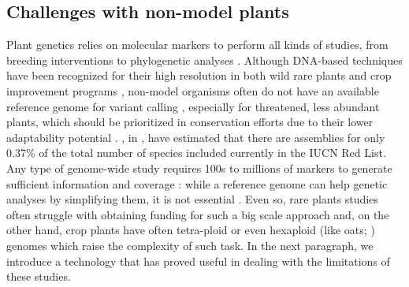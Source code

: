 \documentclass[a4paper, 12pt]{report}
\begin{document}
\subsection{Challenges with non-model plants}
Plant genetics relies on molecular markers to perform all kinds of studies, from breeding interventions to phylogenetic analyses \parencite{heGenotypingbysequencingGBSUltimate2014}. Although DNA-based techniques have been recognized for their high resolution in both wild rare plants and crop improvement programs \parencite{salgotraGeneticDiversityConservation2023}, non-model organisms often do not have an available reference genome for variant calling \parencite{suppleConservationBiodiversityGenomics2018}, especially for threatened, less abundant plants, which should be prioritized in conservation efforts due to their lower adaptability potential \parencite{yinPlantConservationAge2024}. \citeauthor{yinPlantConservationAge2024}, in \citeyear{yinPlantConservationAge2024}, have estimated that there are assemblies for only 0.37\% of the total number of species included currently in the IUCN Red List. Any type of genome-wide study requires 100s to millions of markers to generate sufficient information and coverage \parencite{heGenotypingbysequencingGBSUltimate2014}: while a reference genome can help genetic analyses by simplifying them, it is not essential \parencite{heGenotypingbysequencingGBSUltimate2014}. Even so, rare plants studies often struggle with obtaining funding for such a big scale approach and, on the other hand, crop plants have often tetra-ploid or even hexaploid (like oats; \cite{heGenotypingbysequencingGBSUltimate2014}) genomes which raise the complexity of such task. In the next paragraph, we introduce a technology that has proved useful in dealing with the limitations of these studies.
\end{document}
